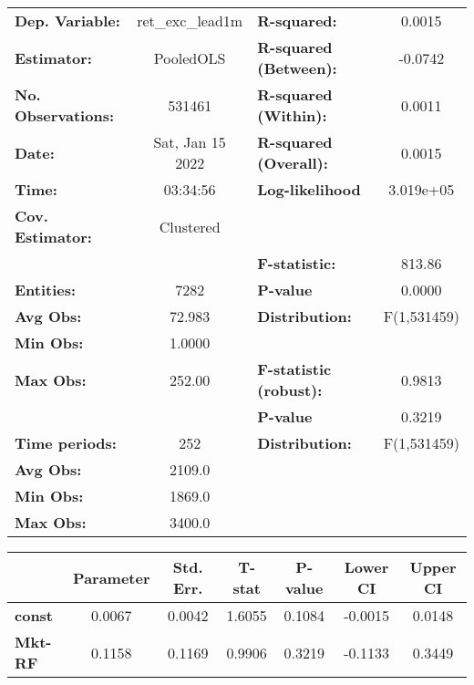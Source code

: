 \begin{center}
\begin{tabular}{lclc}
\toprule
\textbf{Dep. Variable:}    &  ret\_exc\_lead1m  & \textbf{  R-squared:         }   &      0.0015      \\
\textbf{Estimator:}        &     PooledOLS      & \textbf{  R-squared (Between):}  &     -0.0742      \\
\textbf{No. Observations:} &       531461       & \textbf{  R-squared (Within):}   &      0.0011      \\
\textbf{Date:}             &  Sat, Jan 15 2022  & \textbf{  R-squared (Overall):}  &      0.0015      \\
\textbf{Time:}             &      03:34:56      & \textbf{  Log-likelihood     }   &    3.019e+05     \\
\textbf{Cov. Estimator:}   &     Clustered      & \textbf{                     }   &                  \\
\textbf{}                  &                    & \textbf{  F-statistic:       }   &      813.86      \\
\textbf{Entities:}         &        7282        & \textbf{  P-value            }   &      0.0000      \\
\textbf{Avg Obs:}          &       72.983       & \textbf{  Distribution:      }   &   F(1,531459)    \\
\textbf{Min Obs:}          &       1.0000       & \textbf{                     }   &                  \\
\textbf{Max Obs:}          &       252.00       & \textbf{  F-statistic (robust):} &      0.9813      \\
\textbf{}                  &                    & \textbf{  P-value            }   &      0.3219      \\
\textbf{Time periods:}     &        252         & \textbf{  Distribution:      }   &   F(1,531459)    \\
\textbf{Avg Obs:}          &       2109.0       & \textbf{                     }   &                  \\
\textbf{Min Obs:}          &       1869.0       & \textbf{                     }   &                  \\
\textbf{Max Obs:}          &       3400.0       & \textbf{                     }   &                  \\
\bottomrule
\end{tabular}
\begin{tabular}{lcccccc}
                & \textbf{Parameter} & \textbf{Std. Err.} & \textbf{T-stat} & \textbf{P-value} & \textbf{Lower CI} & \textbf{Upper CI}  \\
\midrule
\textbf{const}  &       0.0067       &       0.0042       &      1.6055     &      0.1084      &      -0.0015      &       0.0148       \\
\textbf{Mkt-RF} &       0.1158       &       0.1169       &      0.9906     &      0.3219      &      -0.1133      &       0.3449       \\
\bottomrule
\end{tabular}
\end{center}
